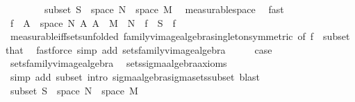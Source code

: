 \begin{isabellebody}
\ \ \isamarkupfalse%
\ {}\isanewline
\ \ \isamarkupfalse%
\ subset{\isacharcolon}{\kern0pt}\ {\isachardoublequoteopen}S\ {\isasymsubseteq}\ space\ N\ {\isasymrightarrow}\ space\ M{\isachardoublequoteclose}\ \isamarkupfalse%
\ measurable{\isacharunderscore}{\kern0pt}space\ \isamarkupfalse%
\ fast\isanewline
\ \ \isamarkupfalse%
\ {\isachardoublequoteopen}{\isacharbraceleft}{\kern0pt}f\ {\isacharminus}{\kern0pt}{\isacharbackquote}{\kern0pt}\ A\ {\isasyminter}\ space\ N\ {\isacharbar}{\kern0pt}A{\isachardot}{\kern0pt}\ A\ {\isasymin}\ M{\isacharbraceright}{\kern0pt}\ {\isasymsubseteq}\ N{\isachardoublequoteclose}\ \ {\isachardoublequoteopen}f\ {\isasymin}\ S{\isachardoublequoteclose}\ \ f\ \isamarkupfalse%
\ measurable{\isacharunderscore}{\kern0pt}iff{\isacharunderscore}{\kern0pt}sets{\isacharbrackleft}{\kern0pt}unfolded\ family{\isacharunderscore}{\kern0pt}vimage{\isacharunderscore}{\kern0pt}algebra{\isacharunderscore}{\kern0pt}singleton{\isacharbrackleft}{\kern0pt}symmetric{\isacharbrackright}{\kern0pt}{\isacharcomma}{\kern0pt}\ of\ f{\isacharbrackright}{\kern0pt}\ {}\ subset\ that\ \isamarkupfalse%
\ {\isacharparenleft}{\kern0pt}fastforce\ simp\ add{\isacharcolon}{\kern0pt}\ sets{\isacharunderscore}{\kern0pt}family{\isacharunderscore}{\kern0pt}vimage{\isacharunderscore}{\kern0pt}algebra{\isacharparenright}{\kern0pt}\isanewline
\ \ \isamarkupfalse%
\ \isamarkupfalse%
\ {\isacharquery}{\kern0pt}case\ \isamarkupfalse%
\ sets{\isacharunderscore}{\kern0pt}family{\isacharunderscore}{\kern0pt}vimage{\isacharunderscore}{\kern0pt}algebra\ \isamarkupfalse%
\ sets{\isachardot}{\kern0pt}sigma{\isacharunderscore}{\kern0pt}algebra{\isacharunderscore}{\kern0pt}axioms\ \isamarkupfalse%
\ {\isacharparenleft}{\kern0pt}simp\ add{\isacharcolon}{\kern0pt}\ subset{\isacharcomma}{\kern0pt}\ intro\ sigma{\isacharunderscore}{\kern0pt}algebra{\isachardot}{\kern0pt}sigma{\isacharunderscore}{\kern0pt}sets{\isacharunderscore}{\kern0pt}subset{\isacharcomma}{\kern0pt}\ blast{\isacharplus}{\kern0pt}{\isacharparenright}{\kern0pt}\isanewline
{}\isamarkupfalse%
\isanewline
\ \ \isamarkupfalse%
\ {}\isanewline
\ \ \isamarkupfalse%
\ subset{\isacharcolon}{\kern0pt}\ {\isachardoublequoteopen}S\ {\isasymsubseteq}\ space\ N\ {\isasymrightarrow}\ space\ M{\isachardoublequoteclose}\ \isamarkupfalse%

\end{isabellebody}
